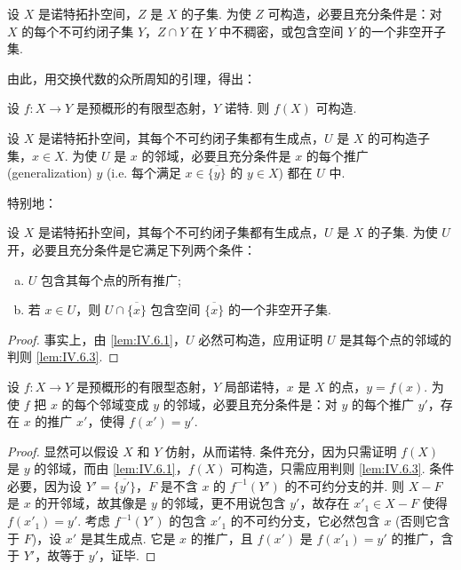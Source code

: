 \begin{lemma}\label{lem:IV.6.1}
设 $X$ 是诺特拓扑空间，$Z$ 是 $X$ 的子集. 为使 $Z$ 可构造，必要且充分条件是：对 $X$ 的每个不可约闭子集 $Y$，$Z \cap Y$ 在 $Y$ 中不稠密，或包含空间 $Y$ 的一个非空开子集.
\end{lemma}

由此，用交换代数的众所周知的引理，得出：

 \begin{lemma}[Chevalley]\label{lem:IV.6.2}
设 $f \colon X \to Y$ 是预概形的有限型态射，$Y$ 诺特. 则 $f(X)$ 可构造.
\end{lemma}

\begin{lemma}\label{lem:IV.6.3}
设 $X$ 是诺特拓扑空间，其每个不可约闭子集都有生成点，$U$ 是 $X$ 的可构造子集，$x \in X$. 为使 $U$ 是 $x$ 的邻域，必要且充分条件是 $x$ 的每个推广 (generalization) $y$ (i.e. 每个满足 $x \in \overline{\{y\}}$ 的 $y \in X$) 都在 $U$ 中.
\end{lemma}

特别地：

\begin{corollary}\label{cor:IV.6.4}
设 $X$ 是诺特拓扑空间，其每个不可约闭子集都有生成点，$U$ 是 $X$ 的子集. 为使 $U$ 开，必要且充分条件是它满足下列两个条件：
\begin{enumerate}[a)]
\item $U$ 包含其每个点的所有推广; 
\item 若 $x \in U$，则 $U \cap \overline{\{x\}}$ 包含空间 $\overline{\{x\}}$ 的一个非空开子集.
\end{enumerate}
\end{corollary}

\begin{proof}
事实上，由 \ref{lem:IV.6.1}，$U$ 必然可构造，应用证明 $U$ 是其每个点的邻域的判则 \ref{lem:IV.6.3}.
\end{proof}

\begin{corollary}\label{cor:IV.6.5}
设 $f \colon X \to Y$ 是预概形的有限型态射，$Y$ 局部诺特，$x$ 是 $X$ 的点，$y = f(x)$. 为使 $f$ 把 $x$ 的每个邻域变成 $y$ 的邻域，必要且充分条件是：对 $y$ 的每个推广 $y'$，存在 $x$ 的推广 $x'$，使得 $f(x') = y'$.
\end{corollary}

\begin{proof}
显然可以假设 $X$ 和 $Y$ 仿射，从而诺特. 条件充分，因为只需证明 $f(X)$ 是 $y$ 的邻域，而由 \ref{lem:IV.6.1}，$f(X)$ 可构造，只需应用判则 \ref{lem:IV.6.3}. 条件必要，因为设 $Y' = \overline{\{y'\}}$，$F$ 是不含 $x$ 的 $f^{-1}(Y')$ 的不可约分支的并. 则 $X - F$ 是 $x$ 的开邻域，故其像是 $y$ 的邻域，更不用说包含 $y'$，故存在 $x'_1 \in X - F$ 使得 $f(x'_1) = y'$. 考虑 $f^{-1}(Y')$ 的包含 $x'_1$ 的不可约分支，它必然包含 $x$ (否则它含于 $F$)，设 $x'$ 是其生成点. 它是 $x$ 的推广，且 $f(x')$ 是 $f(x'_1) = y'$ 的推广，含于 $Y'$，故等于 $y'$，证毕.
\end{proof}

